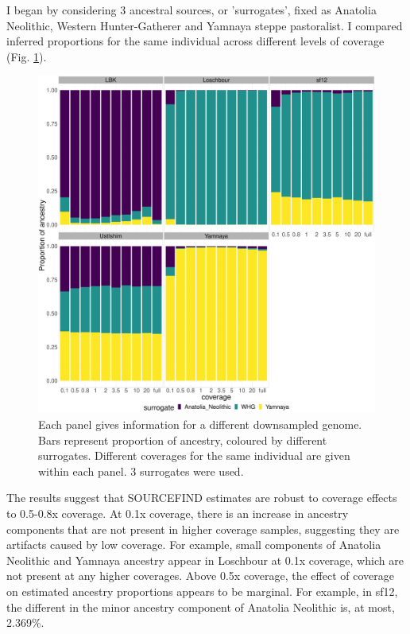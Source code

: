 I began by considering 3 ancestral sources, or 'surrogates', fixed as Anatolia Neolithic, Western Hunter-Gatherer and Yamnaya steppe pastoralist. I compared inferred proportions for the same individual across different levels of coverage (Fig. \ref{fig:3pop_SF_downsampled}). 

\begin{figure}[htp]
    \centering
    \includegraphics[width=1.0\textwidth]{../images/chapter1/3pop_SF_downsampled.pdf}
    \caption{Each panel gives information for a different downsampled genome. Bars represent proportion of ancestry, coloured by different surrogates. Different coverages for the same individual are given within each panel. 3 surrogates were used.}
    \label{fig:3pop_SF_downsampled}
\end{figure}

The results suggest that SOURCEFIND estimates are robust to coverage effects to 0.5-0.8x coverage. At 0.1x coverage, there is an increase in ancestry components that are not present in higher coverage samples, suggesting they are artifacts caused by low coverage. For example, small components of Anatolia Neolithic and Yamnaya ancestry appear in Loschbour at 0.1x coverage, which are not present at any higher coverages. Above 0.5x coverage, the effect of coverage on estimated ancestry proportions appears to be marginal. For example, in sf12, the different in the minor ancestry component of Anatolia Neolithic is, at most, 2.369\%. 

